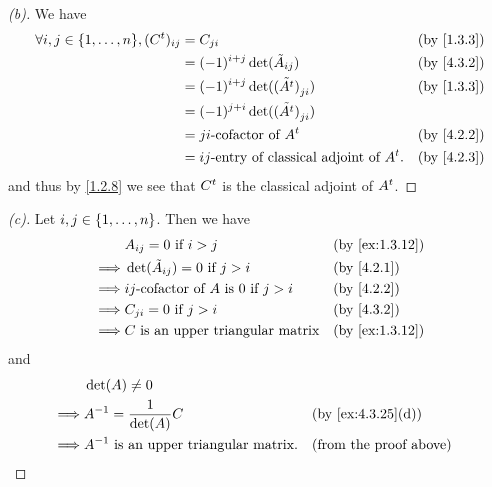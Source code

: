 \begin{proof}[(b)]
	We have
	\begin{align*}
		\forall i, j \in \set{1, \dots, n}, (\tp{C})_{i j} & = C_{j i}                                           &  & \by{1.3.3} \\
		                                                   & = (-1)^{i + j} \det(\tilde{A}_{i j})                &  & \by{4.3.2} \\
		                                                   & = (-1)^{i + j} \det(\tilde{(\tp{A})}_{j i})         &  & \by{1.3.3} \\
		                                                   & = (-1)^{j + i} \det(\tilde{(\tp{A})}_{j i})                         \\
		                                                   & = j i\text{-cofactor of } \tp{A}                    &  & \by{4.2.2} \\
		                                                   & = i j\text{-entry of classical adjoint of } \tp{A}. &  & \by{4.2.3}
	\end{align*}
	and thus by \cref{1.2.8} we see that \({C}^{t}\) is the classical adjoint of \({A}^{t}\).
\end{proof}

\begin{proof}[(c)]
	Let \(i, j \in \left\lbrace1, \dots, n\right\rbrace\).
	Then we have
	\begin{align*}
		         & A_{i j} = 0 \text{ if } i > j                             &  & \by{ex:1.3.12} \\
		\implies & \det(\tilde{A}_{i j}) = 0 \text{ if } j > i               &  & \by{4.2.1}     \\
		\implies & i j\text{-cofactor of } A \text{ is } 0 \text{ if } j > i &  & \by{4.2.2}     \\
		\implies & C_{j i} = 0 \text{ if } j > i                             &  & \by{4.3.2}     \\
		\implies & C \text{ is an upper triangular matrix}                   &  & \by{ex:1.3.12}
	\end{align*}
	and
	\begin{align*}
		         & \det(A) \neq 0                                                                   \\
		\implies & A^{-1} = \frac{1}{\det(A)} C                  &  & \by{ex:4.3.25}[d]             \\
		\implies & A^{-1} \text{ is an upper triangular matrix}. &  & \text{(from the proof above)}
	\end{align*}
\end{proof}

